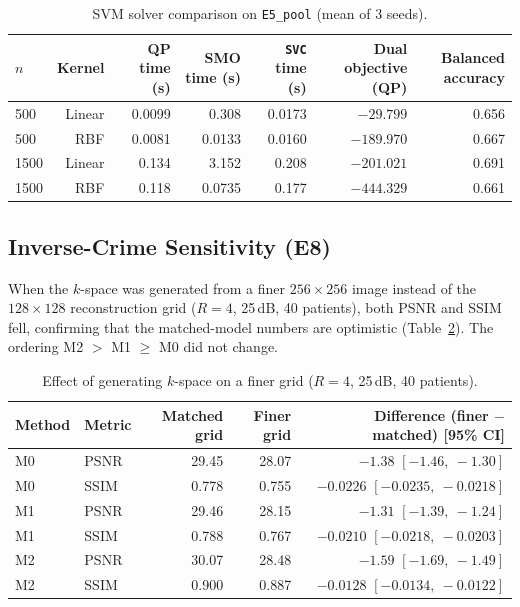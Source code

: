 \documentclass[conference,a4paper]{IEEEtran}
\begin{document}
\begin{table}[!tb]
\centering
\caption{SVM solver comparison on \texttt{E5\_pool} (mean of 3 seeds).}
\label{tab:svm}
\footnotesize
\begin{tabular}{@{}lrrrrrr@{}}
\toprule
$n$ & Kernel & QP time (s) & SMO time (s) & \texttt{SVC} time (s) & Dual objective (QP) & Balanced accuracy\\
\midrule
500 & Linear & 0.0099 & 0.308 & 0.0173 & $-29.799$ & 0.656\\
500 & RBF & 0.0081 & 0.0133 & 0.0160 & $-189.970$ & 0.667\\
1500 & Linear & 0.134 & 3.152 & 0.208 & $-201.021$ & 0.691\\
1500 & RBF & 0.118 & 0.0735 & 0.177 & $-444.329$ & 0.661\\
\bottomrule
\end{tabular}
\end{table}





\subsection{Inverse-Crime Sensitivity (E8)}
When the $k$-space was generated from a finer $256\times256$ image instead of the $128\times128$ reconstruction grid ($R=4$, 25\,dB, 40 patients), both PSNR and SSIM fell, confirming that the matched-model numbers are optimistic (Table~\ref{tab:crime}). The ordering M2 $>$ M1 $\ge$ M0 did not change.

\begin{table}[!tb]
\centering
\caption{Effect of generating $k$-space on a finer grid ($R=4$, 25\,dB, 40 patients).}
\label{tab:crime}
\footnotesize
\begin{tabular}{@{}llrrr@{}}
\toprule
Method & Metric & Matched grid & Finer grid & Difference (finer $-$ matched) [95\% CI]\\
\midrule
M0 & PSNR & 29.45 & 28.07 & $-1.38$ $[-1.46,\ -1.30]$\\
M0 & SSIM & 0.778 & 0.755 & $-0.0226$ $[-0.0235,\ -0.0218]$\\
M1 & PSNR & 29.46 & 28.15 & $-1.31$ $[-1.39,\ -1.24]$\\
M1 & SSIM & 0.788 & 0.767 & $-0.0210$ $[-0.0218,\ -0.0203]$\\
M2 & PSNR & 30.07 & 28.48 & $-1.59$ $[-1.69,\ -1.49]$\\
M2 & SSIM & 0.900 & 0.887 & $-0.0128$ $[-0.0134,\ -0.0122]$\\
\bottomrule
\end{tabular}
\end{table}
\end{document}
